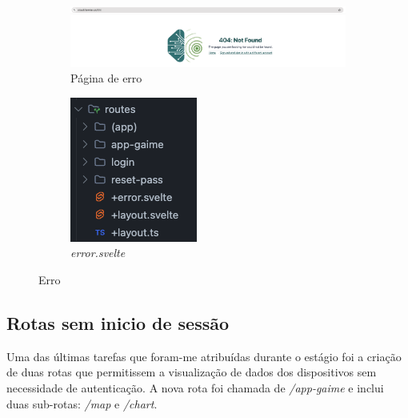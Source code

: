 \begin{figure}[!h]
	\centering
	\begin{subfigure}[c]{0.80\textwidth}
		\centering
		\includegraphics[width=\textwidth]{figs/404.png}
		\caption{Página de erro}
		\label{fig:404}
	\end{subfigure}
	\hfill
	\begin{subfigure}[c]{0.15\textwidth}
        \centering
        \includegraphics[width=\textwidth]{figs/errorRoute.png}
        \caption{\textit{error.svelte}}
        \label{fig:errorRoute}
	\end{subfigure}
	\caption{Erro}
\end{figure}

\clearpage
\subsection{Rotas sem inicio de sessão}\label{sec:noLoginInterface} %
Uma das últimas tarefas que foram-me atribuídas durante o estágio foi a criação de duas rotas que permitissem a visualização de dados dos dispositivos sem necessidade de autenticação. A nova rota foi chamada de \textit{/app-gaime} e inclui duas sub-rotas: \textit{/map} e \textit{/chart}.

